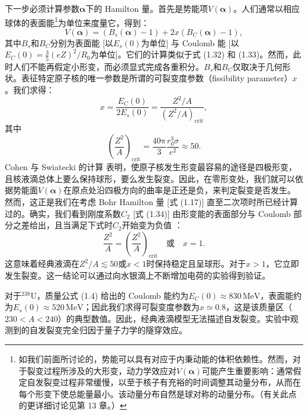 下一步必须计算参数$\boldsymbol{\alpha}$下的 Hamilton 量。首先是势能项$V(\boldsymbol{\alpha})$。人们通常以相应球体的表面能\footnote{如我们前面所讨论的，势能可以具有对应于内秉动能的体积依赖性。然而，对于裂变过程所涉及的大形变，动力学效应对$V(\boldsymbol{\alpha})$可能产生重要影响：通常假定自发裂变过程非常缓慢，以至于核子有充裕的时间调整其动量分布，从而在每个形变下使总能量最小。该动量分布自然是球对称的动量分布。（有关此点的更详细讨论见第
13 章。）}为单位来度量它，得到：
\begin{equation}
V(\boldsymbol{\alpha})=(B_{s}(\boldsymbol{\alpha})-1)+2x(B_{C}(\boldsymbol{\alpha})-1),\label{eq:1.80}
\end{equation}
其中$B_{s}$和$B_{C}$分别为表面能 {[}以$E_{s}(0)$为单位{]} 与 Coulomb 能 {[}以$E_{C}(0)=\frac{3}{5}(eZ)^{2}/R_{0}$为单位{]}。它们的计算类似于式
(1.32) 和 (1.33)。然而，此时人们不能再假定小形变，而必须显式完成各重积分。$B_{s}$和$B_{C}$仅取决于几何形状。表征特定原子核的唯一参数是所谓的可裂变度参数（fissibility
parameter）$x$。我们求得：
\begin{equation}
x=\frac{E_{C}(0)}{2E_{s}(0)}=\frac{Z^{2}/A}{(Z^{2}/A)_{\text{crit}}},\label{eq:1.81}
\end{equation}
其中
\begin{equation}
\left(\frac{Z^{2}}{A}\right)_{\text{crit}}=\frac{40\mathrm{\pi}}{3}\frac{r^{3}_{0}\sigma}{e^{2}}\approx50.\label{eq:1.82}
\end{equation}
Cohen 与 Swiatecki 的计算 \cite{CS62,CS63} 表明，使原子核发生形变最容易的途径是四极形变，且核液滴总体上要么保持球形，要么发生裂变。因此，在零形变处，我们就可以依据势能面$V(\boldsymbol{\alpha})$在原点处沿四极方向的曲率是正还是负，来判定裂变是否发生。然而，这正是我们在考虑
Bohr Hamilton 量 {[}式 (1.17){]} 直至二次项时所已经计算过的。确实，我们看到刚度系数$C_{2}$ {[}式
(1.34){]} 由形变能的表面部分与 Coulomb 部分之差给出，且当满足下式时$C_{2}$开始变为负值 \cite{Wi64}：
\begin{equation}
\frac{Z^{2}}{A}=\left(\frac{Z^{2}}{A}\right)_{\text{crit}}\quad\text{或}\quad x=1.\label{eq:1.83}
\end{equation}
这意味着经典液滴在$Z^{2}/A\lesssim50$或$x<1$时保持稳定且呈球形。对于$x>1$，它立即发生裂变。这一结论可以通过向水银滴上不断增加电荷的实验得到验证。

对于$^{238}\text{U}$，质量公式 (1.4) 给出的 Coulomb 能约为$E_{C}(0)\approx830\,\text{MeV}$，表面能约为$E_{s}(0)\approx520\,\text{MeV}$；因此我们求得可裂变度参数为$x\simeq0.8$，这是该质量区（$230<A<240$）的典型数值。因此，经典液滴模型无法描述自发裂变。实验中观测到的自发裂变完全归因于量子力学的隧穿效应。

